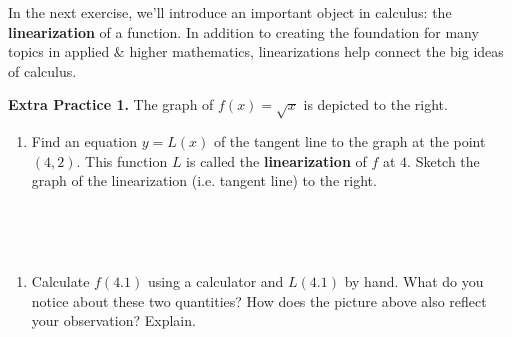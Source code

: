 \documentclass[10pt]{article}
\begin{document}
\vfill

In the next exercise, we'll introduce an important object in calculus: the {\bf linearization} of a function. In addition to creating the foundation for many topics in applied \& higher mathematics, linearizations help connect the big ideas of calculus.

\begin{minipage}[t][3in][t]{0.45\textwidth}
{\bf\color{blue}Extra Practice 1.} The graph of $f(x)=\sqrt{x}$ is depicted to the right.
\begin{enumerate}
\item[i.] Find an equation $y=L(x)$ of the tangent line to the graph at the point $(4,2)$. This function $L$ is called the {\bf linearization} of $f$ at $4$. Sketch the graph of the linearization (i.e. tangent line) to the right.
\end{enumerate}
\end{minipage}
%
\hfill
%
\begin{minipage}[t][3in][t]{0.45\textwidth}
\,\begin{center}
\end{center}
\end{minipage}
%
\hfill\,

\begin{enumerate}
\item[ii.] Calculate $f(4.1)$ using a calculator and $L(4.1)$ by hand. What do you notice about these two quantities? How does the picture above also reflect your observation? Explain.

\vfill



\end{enumerate}
\end{document}
